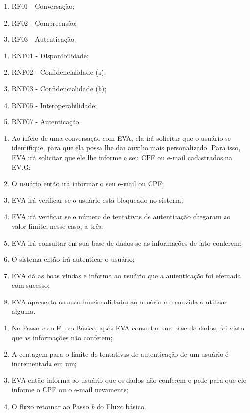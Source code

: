         \begin{enumerate}[label=\alph*)]
        \tightlist
            \item RF01 - Conversação;
            \item RF02 - Compreensão;
            \item RF03 - Autenticação.
        \end{enumerate}
        
\begin{enumerate}[label=\alph*)]
    \tightlist
    \item RNF01 - Disponibilidade;
    \item RNF02 - Confidencialidade (a);
    \item RNF03 - Confidencialidade (b);
    \item RNF05 - Interoperabilidade;
    \item RNF07 - Autenticação.
\end{enumerate}
        
    \begin{enumerate}[label=\alph*)]
    \tightlist
        \item Ao início de uma conversação com EVA, ela irá solicitar que o usuário se identifique, para que ela possa lhe dar auxilio mais personalizado. Para isso, EVA irá solicitar que ele lhe informe o seu CPF ou e-mail cadastrados na EV.G;
        \item O usuário então irá informar o seu e-mail ou CPF;
        \item EVA irá verificar se o usuário está bloqueado no sistema;
        \item EVA irá verificar se o número de tentativas de autenticação chegaram ao valor limite, nesse caso, a três;
        \item EVA irá consultar em sua base de dados se as informações de fato conferem;
        \item O sistema então irá autenticar o usuário;
        \item EVA dá as boas vindas e informa ao usuário que a autenticação foi efetuada com sucesso;
        \item EVA apresenta as suas funcionalidades ao usuário e o convida a utilizar alguma.
    \end{enumerate}
        
        \begin{enumerate}[label=\alph*)]
        \tightlist
            \item No Passo \textit{e} do Fluxo Básico, após EVA consultar sua base de dados, foi visto que as informações não conferem;
            \item A contagem para o limite de tentativas de autenticação de um usuário é incrementada em um;
            \item EVA então informa ao usuário que os dados não conferem e pede para que ele informe o CPF ou o e-mail novamente;
            \item O fluxo retornar ao Passo \textit{b} do Fluxo básico.
        \end{enumerate}
        
